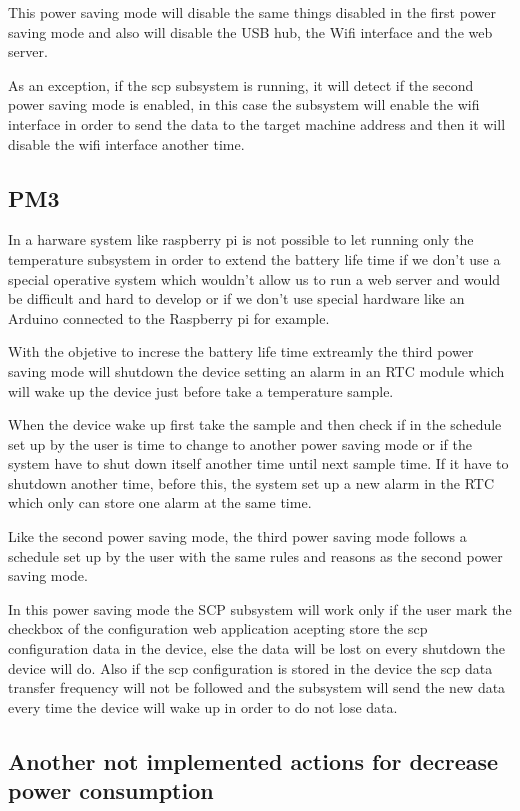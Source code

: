 		This power saving mode will disable the same things disabled in the first power saving mode and also will disable the USB hub, the Wifi interface and the web server.

		As an exception, if the scp subsystem is running, it will detect if the second power saving mode is enabled, in this case the subsystem will enable the wifi interface in order to send the data to the target machine address and then it will disable the wifi interface another time.

		\subsection{PM3}
		In a harware system like raspberry pi is not possible to let running only the temperature subsystem in order to extend the battery life time if we don't use a special operative system which wouldn't allow us to run a web server and would be difficult and hard to develop or if we don't use special hardware like an Arduino connected to the Raspberry pi for example.

		With the objetive to increse the battery life time extreamly the third power saving mode will shutdown the device setting an alarm in an RTC module which will wake up the device just before take a temperature sample.

		When the device wake up first take the sample and then check if in the schedule set up by the user is time to change to another power saving mode or if the system have to shut down itself another time until next sample time. If it have to shutdown another time, before this, the system set up a new alarm in the RTC which only can store one alarm at the same time.

		Like the second power saving mode, the third power saving mode follows a schedule set up by the user with the same rules and reasons as the second power saving mode.

		In this power saving mode the SCP subsystem will work only if the user mark the checkbox of the configuration web application acepting store the scp configuration data in the device, else the data will be lost on every shutdown the device will do. Also if the scp configuration is stored in the device the scp data transfer frequency will not be followed and the subsystem will send the new data every time the device will wake up in order to do not lose data.

		\subsection{Another not implemented actions for decrease power consumption}
